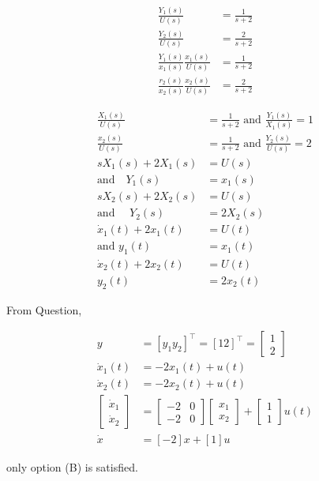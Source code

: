 \documentclass[11pt,a4paper]{article}
\begin{document}
\begin{tcolorbox}[solbox, title=Detailed Solution -- Question 122]
\[
\begin{aligned} \frac{Y_{1}(s)}{U(s)} &=\frac{1}{s+2} \\ \frac{Y_{2}(s)}{U(s)} &=\frac{2}{s+2} \\ \frac{Y_{1}(s)}{x_{1}(s)} \frac{x_{1}(s)}{U(s)} &=\frac{1}{s+2} \\ \frac{r_{2}(s)}{x_{2}(s)} \frac{x_{2}(s)}{U(s)} &=\frac{2}{s+2} \end{aligned}
\]

\[
\begin{aligned} \frac{X_{1}(s)}{U(s)} &=\frac{1}{s+2} \text { and } \frac{Y_{1}(s)}{X_{1}(s)}=1 \\ \frac{x_{2}(s)}{U(s)} &=\frac{1}{s+2} \text { and } \frac{Y_{2}(s)}{U(s)}=2 \\ s X_{1}(s)+2 X_{1}(s) &=U(s) \\ \text{and} \quad Y_{1}(s) &=x_{1}(s) \\ s X_{2}(s)+2 X_{2}(s) &=U(s) \\ \text{and }\quad Y_{2}(s)&=2 X_{2}(s) \\ \dot{x}_{1}(t)+2 x_{1}(t)&=U(t) \\ \text{and }y_{1}(t)&=x_{1}(t) \\ \dot{x}_{2}(t)+2 x_{2}(t)&=U(t) \\ y_{2}(t)&=2 x_{2}(t) \end{aligned}
\]

 From Question,

\[
\begin{aligned} y &=\left[y_{1} y_{2}\right]^{\top}=[12]^{\top}=\left[\begin{array}{l}1 \\2\end{array}\right] \\ \dot{x}_{1}(t) &=-2 x_{1}(t)+u(t) \\ \dot{x}_{2}(t) &=-2 x_{2}(t)+u(t) \\ \left[\begin{array}{c}\dot{x}_{1} \\\dot{x}_{2}\end{array}\right]&=\left[\begin{array}{cc}-2 & 0 \\-2 & 0\end{array}\right]\left[\begin{array}{l}x_{1} \\x_{2} \end{array}\right]+\left[\begin{array}{l}1 \\1\end{array}\right] u(t) \\ \dot{x} &=[-2] x+[1] u \end{aligned}
\]

 only option (B) is satisfied.
\end{tcolorbox}
\end{document}
